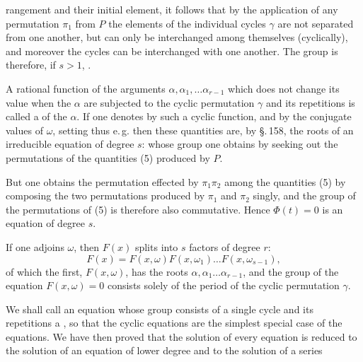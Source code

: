 rangement and their initial element, it follows that by the application of any permutation $\pi_1$ from $P$ the elements of the individual cycles $\gamma$ are not separated from one another, but can only be interchanged among themselves (cyclically), and moreover the cycles can be interchanged with one another. The group is therefore, if $s>1$, .

A rational function of the arguments $\alpha,\alpha_1,\ldots\alpha_{r-1}$ which does not change its value when the $\alpha$ are subjected to the cyclic permutation $\gamma$ and its repetitions is called a  of the $\alpha$. If one denotes by
such a cyclic function, and by
the conjugate values of $\omega$, setting thus e.\,g.
then these quantities are, by \S.\,158, the roots of an irreducible equation of degree $s$:
whose group one obtains by seeking out the permutations of the quantities (5) produced by $P$.

But one obtains the permutation effected by $\pi_1\pi_2$ among the quantities (5) by composing the two permutations produced by $\pi_1$ and $\pi_2$ singly, and the group of the permutations of (5) is therefore also commutative. Hence $\Phi(t)=0$ is an  equation of degree $s$.

If one adjoins $\omega$, then $F(x)$ splits into $s$ factors of degree $r$:
\[
F(x) = F(x,\omega)F(x,\omega_1)\ldots F(x,\omega_{s-1}),
\]
of which the first, $F(x,\omega)$, has the roots $\alpha,\alpha_1\ldots\alpha_{r-1}$, and the group of the equation $F(x,\omega)=0$ consists solely of the period of the cyclic permutation $\gamma$.

We shall call an equation whose group consists of a single cycle and its repetitions a , so that the cyclic equations are the simplest special case of the  equations. We have then proved that the solution of every  equation is reduced to the solution of an  equation of lower degree and to the solution of a series
